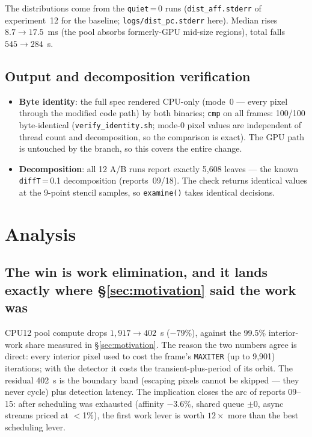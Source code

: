 \documentclass[
	english,
	letterpaper, oneside
]{article}
\begin{document}
The distributions come from the \texttt{quiet}\,=\,0 runs
(\texttt{dist\_aff.stderr} of experiment~12 for the baseline;
\texttt{logs/dist\_pc.stderr} here). Median rises $8.7 \to 17.5$~ms (the pool
absorbs formerly-GPU mid-size regions), total falls $545 \to 284$~s.

\subsection{Output and decomposition verification}
\label{sec:verify}

\begin{itemize}
  \item \textbf{Byte identity}: the full spec rendered CPU-only (mode~0 ---
        every pixel through the modified code path) by both binaries;
        \texttt{cmp} on all frames: 100/100 byte-identical
        (\texttt{verify\_identity.sh}; mode-0 pixel values are independent of
        thread count and decomposition, so the comparison is exact). The GPU
        path is untouched by the branch, so this covers the entire change.
  \item \textbf{Decomposition}: all 12 A/B runs report exactly
        5{,}608 leaves --- the known \texttt{diffT}\,=\,0.1
        decomposition (reports~09/18). The check returns identical values at
        the 9-point stencil samples, so \texttt{examine()} takes identical
        decisions.
\end{itemize}

\section{Analysis}
\label{sec:analysis}

\subsection{The win is work elimination, and it lands exactly where \S\ref{sec:motivation} said the work was}

CPU12 pool compute drops $1{,}917 \to 402$~s ($-79\%$), against the 99.5\%
interior-work share measured in \S\ref{sec:motivation}. The reason the two
numbers agree is direct: every interior pixel used to cost the frame's
\texttt{MAXITER} (up to 9{,}901) iterations; with the detector it costs the
transient-plus-period of its orbit. The residual 402~s is the boundary band
(escaping pixels cannot be skipped --- they never cycle) plus detection
latency. The implication closes the arc of reports 09--15: after scheduling
was exhausted (affinity $-3.6\%$, shared queue $\pm 0$, async streams priced
at $<$1\%), the first work lever is worth $12\times$ more than the best
scheduling lever.
\end{document}
